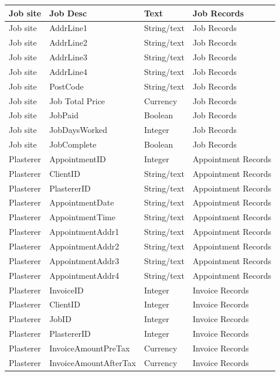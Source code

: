 \begin{flushleft}
\begin{longtable}{|p{3cm}|p{3cm}|p{3cm}|p{3cm}|}
Job site & Job Desc & Text & Job Records \\ \hline
Job site & AddrLine1 & String/text & Job Records \\ \hline
Job site & AddrLine2 & String/text & Job Records \\ \hline
Job site & AddrLine3 & String/text & Job Records \\ \hline
Job site & AddrLine4 & String/text & Job Records \\ \hline
Job site & PostCode  & String/text & Job Records \\ \hline
Job site & Job Total Price & Currency & Job Records \\ \hline
Job site & JobPaid     & Boolean & Job Records \\ \hline
Job site & JobDaysWorked & Integer & Job Records \\ \hline
Job site & JobComplete & Boolean & Job Records \\ \hline   
Plasterer & AppointmentID & Integer & Appointment Records \\ \hline
Plasterer & ClientID & String/text & Appointment Records \\ \hline 
Plasterer & PlastererID & String/text & Appointment Records \\ \hline
Plasterer & AppointmentDate & String/text & Appointment Records \\ \hline
Plasterer & AppointmentTime & String/text & Appointment Records \\ \hline
Plasterer & AppointmentAddr1 & String/text & Appointment Records \\ \hline
Plasterer & AppointmentAddr2 & String/text & Appointment Records \\ \hline
Plasterer & AppointmentAddr3 & String/text & Appointment Records \\ \hline
Plasterer & AppointmentAddr4 & String/text & Appointment Records \\ \hline
Plasterer & InvoiceID & Integer & Invoice Records \\ \hline
Plasterer & ClientID	& Integer & Invoice Records \\ \hline
Plasterer & JobID & Integer & Invoice Records \\ \hline
Plasterer & PlastererID & Integer & Invoice Records \\ \hline
Plasterer & InvoiceAmountPreTax & Currency & Invoice Records \\ \hline
Plasterer & InvoiceAmountAfterTax & Currency & Invoice Records \\ \hline

\end{longtable}
\end{flushleft}
